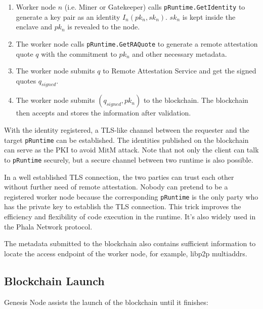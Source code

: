 \begin{enumerate}
    \item Worker node  $n$  (i.e. Miner or Gatekeeper) calls \texttt{pRuntime.GetIdentity} to generate a key pair as an identity $I_n(pk_n, sk_n)$.  $sk_n$ is kept inside the enclave and $pk_n$ is revealed to the node.

    \item The worker node calls \texttt{pRuntime.GetRAQuote} to generate a remote attestation quote $q$ with the commitment to $pk_n$ and other necessary metadata.

    \item The worker node submits $q$ to Remote Attestation Service and get the signed quotes $q_{signed}$.

    \item The worker node submits $(q_{signed}, pk_n)$ to the blockchain. The blockchain then accepts and stores the information after validation.
\end{enumerate}

With the identity registered, a TLS-like channel between the requester and the target \texttt{pRuntime} can be established. The identities published on the blockchain can serve as the PKI to avoid MitM attack. Note that not only the client can talk to \texttt{pRuntime} securely, but a secure channel between two runtime is also possible.

In a well established TLS connection, the two parties can trust each other without further need of remote attestation. Nobody can pretend to be a registered worker node because the corresponding \texttt{pRuntime} is the only party who has the private key to establish the TLS connection. This trick improves the efficiency and flexibility of code execution in the runtime. It's also widely used in the Phala Network protocol.

The metadata submitted to the blockchain also contains sufficient information to locate the access endpoint of the worker node, for example, libp2p multiaddrs.

\subsection{Blockchain Launch}

Genesis Node assists the launch of the blockchain until it finishes:

